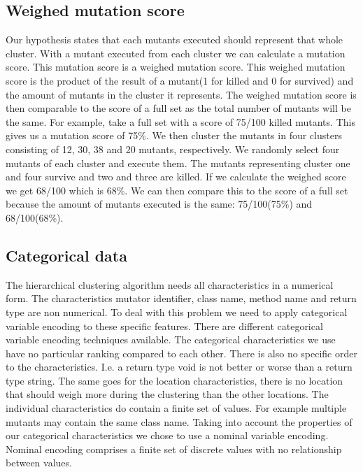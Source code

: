 \documentclass[../main]{subfiles}
\begin{document}
\subsection{Weighed mutation score}
\label{ch:weighed_score}
Our hypothesis states that each mutants executed should represent that whole cluster.
With a mutant executed from each cluster we can calculate a mutation score.
This mutation score is a weighed mutation score.
This weighed mutation score is the product of the result of a mutant(1 for killed and 0 for survived) and the amount of mutants in the cluster it represents.
The weighed mutation score is then comparable to the score of a full set as the total number of mutants will be the same.
\newline
For example, take a full set with a score of 75/100 killed mutants. 
This gives us a mutation score of 75\%. 
We then cluster the mutants in four clusters consisting of 12, 30, 38 and 20 mutants, respectively.
We randomly select four mutants of each cluster and execute them.
The mutants representing cluster one and four survive and two and three are killed.
If we calculate the weighed score we get 68/100 which is 68\%.
We can then compare this to the score of a full set because the amount of mutants executed is the same: 75/100(75\%) and 68/100(68\%).

\subsection{Categorical data}
The hierarchical clustering algorithm needs all characteristics in a numerical form\cite{Vijaya2019ComparativeClustering}.
The characteristics mutator identifier, class name, method name and return type are non numerical.
To deal with this problem we need to apply categorical variable encoding to these specific features.
There are different categorical variable encoding techniques available\cite{Potdar2017AClassifiers}.
The categorical characteristics we use have no particular ranking compared to each other.
There is also no specific order to the characteristics.
I.e. a return type void is not better or worse than a return type string.
The same goes for the location characteristics, there is no location that should weigh more during the clustering than the other locations.
The individual characteristics do contain a finite set of values.
For example multiple mutants may contain the same class name.
Taking into account the properties of our categorical characteristics we chose to use a nominal variable encoding.
Nominal encoding comprises a finite set of discrete values with no relationship between values\cite{Potdar2017AClassifiers}.
\end{document}
